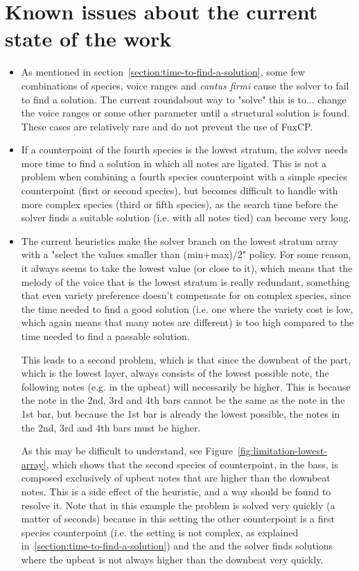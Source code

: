 \section{Known issues about the current state of the work} \label{section:known-issues-about-the-current-state-of-the-work}
\begin{itemize}
  \item As mentioned in section~\ref{section:time-to-find-a-solution}, some few combinations of species, voice ranges and \textit{cantus firmi} cause the solver to fail to find a solution. The current roundabout way to "solve" this is to... change the voice ranges or some other parameter until a structural solution is found. These cases are relatively rare and do not prevent the use of FuxCP.
  \item If a counterpoint of the fourth species is the lowest stratum, the solver needs more time to find a solution in which all notes are ligated. This is not a problem when combining a fourth species counterpoint with a simple species counterpoint (first or second species), but becomes difficult to handle with more complex species (third or fifth species), as the search time before the solver finds a suitable solution (i.e. with all notes tied) can become very long.
  \item The current heuristics make the solver branch on the lowest stratum array with a "select the values smaller than (min+max)/2" policy. For some reason, it always seems to take the lowest value (or close to it), which means that the melody of the voice that is the lowest stratum is really redundant, something that even variety preference doesn't compensate for on complex species, since the time needed to find a good solution (i.e. one where the variety cost is low, which again means that many notes are different) is too high compared to the time needed to find a passable solution.
  
  This leads to a second problem, which is that since the downbeat of the part, which is the lowest layer, always consists of the lowest possible note, the following notes (e.g. in the upbeat) will necessarily be higher. This is because the note in the 2nd, 3rd and 4th bars cannot be the same as the note in the 1st bar, but because the 1st bar is already the lowest possible, the notes in the 2nd, 3rd and 4th bars must be higher. 
  
  As this may be difficult to understand, see Figure~\ref{fig:limitation-lowest-array}, which shows that the second species of counterpoint, in the bass, is composed exclusively of upbeat notes that are higher than the downbeat notes. This is a side effect of the heuristic, and a way should be found to resolve it. Note that in this example the problem is solved very quickly (a matter of seconds) because in this setting the other counterpoint is a first species counterpoint (i.e. the setting is not complex, as explained in~\ref{section:time-to-find-a-solution}) and the and the solver finds solutions where the upbeat is not always higher than the downbeat very quickly.
\end{itemize}
